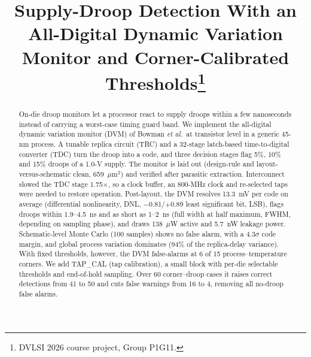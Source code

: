 \documentclass[conference]{IEEEtran}
\begin{document}
\newcommand{\tbd}{\textcolor{red}{TBD}}
\newcommand{\sig}[1]{\texttt{#1}}

\title{Supply-Droop Detection With an All-Digital Dynamic Variation Monitor and Corner-Calibrated Thresholds\thanks{DVLSI 2026 course project, Group P1G11.}}

\author{
\and
{}
}

\maketitle

\begin{abstract}
On-die droop monitors let a processor react to supply droops within a few nanoseconds instead of carrying a worst-case timing guard band. We implement the all-digital dynamic variation monitor (DVM) of Bowman \emph{et al.}\ at transistor level in a generic 45-nm process. A tunable replica circuit (TRC) and a 32-stage latch-based time-to-digital converter (TDC) turn the droop into a code, and three decision stages flag 5\%, 10\% and 15\% droops of a 1.0-V supply. The monitor is laid out (design-rule and layout-versus-schematic clean, 659~$\mu$m$^2$) and verified after parasitic extraction. Interconnect slowed the TDC stage 1.75$\times$, so a clock buffer, an 800-MHz clock and re-selected taps were needed to restore operation. Post-layout, the DVM resolves 13.3~mV per code on average (differential nonlinearity, DNL, $-$0.81/$+$0.89 least significant bit, LSB), flags droops within 1.9--4.5~ns and as short as 1--2~ns (full width at half maximum, FWHM, depending on sampling phase), and draws 138~$\mu$W active and 5.7~nW leakage power. Schematic-level Monte Carlo (100 samples) shows no false alarm, with a $4.3\sigma$ code margin, and global process variation dominates (94\% of the replica-delay variance). With fixed thresholds, however, the DVM false-alarms at 6 of 15 process--temperature corners. We add TAP\_CAL (tap calibration), a small block with per-die selectable thresholds and end-of-hold sampling. Over 60 corner--droop cases it raises correct detections from 41 to 50 and cuts false warnings from 16 to 4, removing all no-droop false alarms.
\end{abstract}
\end{document}

